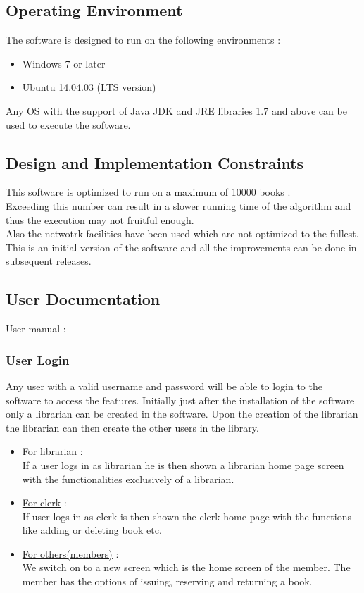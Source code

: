 \documentclass{article}
\begin{document}
\subsection{Operating Environment}
The software is designed to run on the following environments :
\begin{itemize}
\item Windows 7 or later
\item Ubuntu 14.04.03 (LTS version)
\end{itemize}

Any OS with the support of Java JDK and JRE libraries 1.7 and above can be used to execute the software.\\


\subsection{Design and Implementation Constraints}
This software is optimized to run on a maximum of 10000 books .\\
Exceeding this number can result in a slower running time of the algorithm and thus the execution may not fruitful enough.\\
Also the netwotrk facilities have been used which are not optimized to the fullest.\\
This is an initial version of the software and all the improvements can be done in subsequent releases.\\
\subsection{User Documentation}
User manual :

\subsubsection*{User Login}
Any user with a valid username and password will be able to login to the software to access the features. Initially just after the installation of the software only a librarian can be created in the software. Upon the creation of the librarian the librarian can then create the other users in the library.
\begin{itemize}
\item \underline{For librarian} :\\ If a user logs in as librarian he is then shown a librarian home page screen with the functionalities exclusively of a librarian.
\item \underline{For clerk} :\\ If user logs in as clerk is then shown the clerk home page with the functions like adding or deleting book etc.
\item \underline{For others(members)} : \\We switch on to a new screen which is the home screen of the member. The member has the options of issuing, reserving and returning a book.
\end{itemize}
\end{document}
